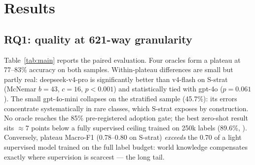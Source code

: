 \documentclass[11pt]{article}
\begin{document}
\section{Results}
\label{sec:results}

\subsection{RQ1: quality at 621-way granularity}

Table~\ref{tab:main} reports the paired evaluation.
Four oracles form a plateau at 77--83\% accuracy on both samples.
Within-plateau differences are small but partly real: deepseek-v4-pro is
significantly better than v4-flash on S-strat (McNemar $b{=}43$, $c{=}16$,
$p<0.001$) and statistically tied with gpt-4o ($p=0.061$). The small
gpt-4o-mini collapses on the stratified sample (45.7\%): its errors
concentrate systematically in rare classes, which S-strat exposes by
construction. No oracle reaches the 85\% pre-registered adoption gate; the
best zero-shot result sits $\approx 7$ points below a fully supervised
ceiling trained on 250k labels (89.6\%, \citealp{Daru2024Dissertacao}).
Conversely, plateau Macro-F1 (0.78--0.80 on S-strat) \emph{exceeds} the
0.70 of a light supervised model trained on the full label budget: world
knowledge compensates exactly where supervision is scarcest --- the long
tail.
\end{document}
